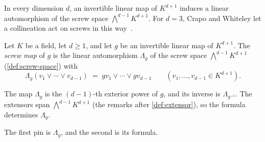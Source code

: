 In every dimension $d$, an invertible linear map of $K^{d+1}$ induces a
linear automorphism of the screw space $\bigwedge^{d-1} K^{d+1}$. For
$d = 3$, Crapo and Whiteley let a collineation act on screws in this
way~\cite[\S3.6]{crapoWhiteley1982}.

\begin{definition}
  \label{def:induced-screw-map}
  \leanok
  Let $K$ be a field, let $d \ge 1$, and let $g$ be an invertible linear
  map of $K^{d+1}$. The \emph{screw map} of $g$ is the linear
  automorphism $\Lambda_g$ of the screw space $\bigwedge^{d-1} K^{d+1}$
  (\cref{def:screw-space}) with
  \[
    \Lambda_g(v_1 \vee \cdots \vee v_{d-1})
    \;=\; g v_1 \vee \cdots \vee g v_{d-1}
    \qquad (v_1, \dots, v_{d-1} \in K^{d+1}).
  \]
\end{definition}

The map $\Lambda_g$ is the $(d-1)$-th exterior power of $g$, and its
inverse is $\Lambda_{g^{-1}}$. The extensors span
$\bigwedge^{d-1} K^{d+1}$ (the remarks after \cref{def:extensor}), so the
formula determines $\Lambda_g$.

\begin{fmlnote}
  The first pin is $\Lambda_g$, and the second is its formula.
\end{fmlnote}

